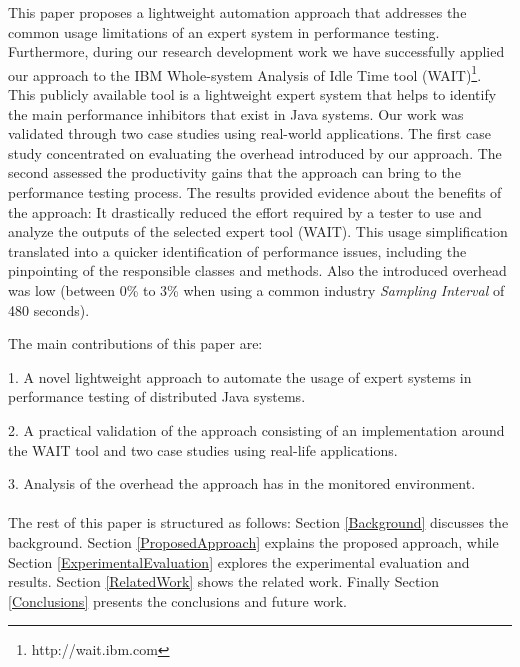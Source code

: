 \documentclass[runningheads,a4paper]{llncs}
\begin{document}
This paper proposes a lightweight automation approach that addresses the common
usage limitations of an expert system in performance testing. Furthermore,
during our research development work we have successfully applied our approach
to the IBM Whole-system Analysis of Idle Time tool (WAIT)\footnote{http://wait.ibm.com}. 
This publicly available tool is a lightweight expert system that helps to
identify the main performance inhibitors that exist in Java systems. Our work was 
validated through two case studies using real-world applications. The first case study 
concentrated on evaluating the overhead introduced by our approach. The second
assessed the productivity gains that the approach can bring to the
performance testing process. The results provided evidence about
the benefits of the approach: It drastically reduced the effort required by a
tester to use and analyze the outputs of the selected expert tool (WAIT). This
usage simplification translated into a quicker identification of performance issues, 
including the pinpointing of the responsible classes and methods. Also the
introduced overhead was low (between 0\% to 3\% when using a common industry
\emph{Sampling Interval} of 480 seconds).

The main contributions of this paper are: 

1. A novel lightweight approach to automate the usage of expert systems in
performance testing of distributed Java systems.

2. A practical validation of the approach consisting of an implementation
around the WAIT tool and two case studies using real-life applications.

3. Analysis of the overhead the approach has in the monitored environment.
\\\\
The rest of this paper is structured as follows: Section \ref{Background}
discusses the background. Section \ref{ProposedApproach} explains the proposed
approach, while Section \ref{ExperimentalEvaluation} explores the experimental 
evaluation and results. Section \ref{RelatedWork} shows the related work.
Finally Section \ref{Conclusions} presents the conclusions and future work.


\vspace{-7pt}
\end{document}

